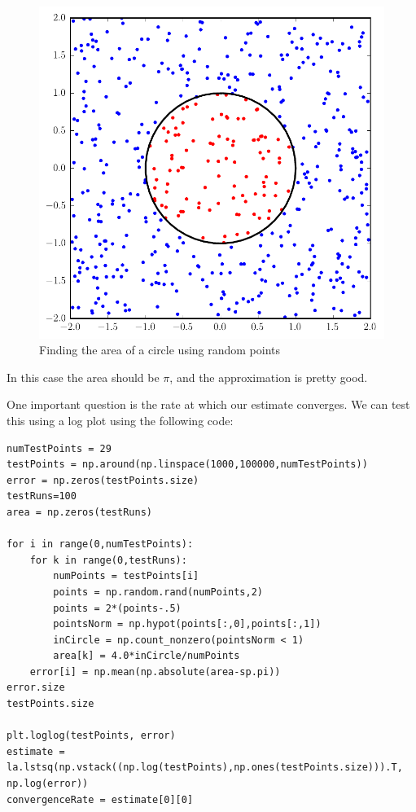\begin{figure}
\includegraphics[width=\textwidth]{MC_Circle.pdf}
\caption{Finding the area of a circle using random points}
\label{fig:MCCircle}
\end{figure}

In this case the area should be $\pi$, and the approximation is pretty good.

One important question is the rate at which our estimate converges. 
We can test this using a log plot using the following code:
\begin{lstlisting}
numTestPoints = 29
testPoints = np.around(np.linspace(1000,100000,numTestPoints))
error = np.zeros(testPoints.size)
testRuns=100
area = np.zeros(testRuns)

for i in range(0,numTestPoints):
	for k in range(0,testRuns):
		numPoints = testPoints[i]
		points = np.random.rand(numPoints,2)
		points = 2*(points-.5)
		pointsNorm = np.hypot(points[:,0],points[:,1])
		inCircle = np.count_nonzero(pointsNorm < 1)
		area[k] = 4.0*inCircle/numPoints
	error[i] = np.mean(np.absolute(area-sp.pi))
error.size
testPoints.size

plt.loglog(testPoints, error)
estimate = la.lstsq(np.vstack((np.log(testPoints),np.ones(testPoints.size))).T, np.log(error))
convergenceRate = estimate[0][0]
\end{lstlisting}

